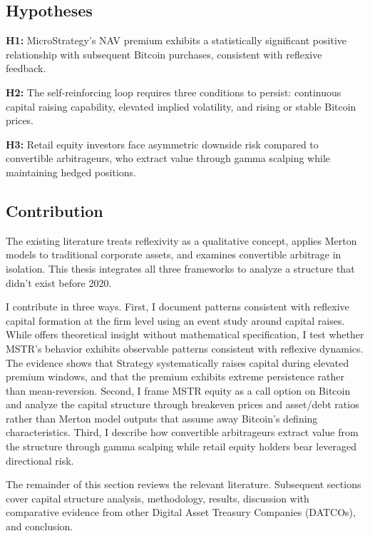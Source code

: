 \subsection{Hypotheses}

\textbf{H1:} MicroStrategy's NAV premium exhibits a statistically significant positive relationship with subsequent Bitcoin purchases, consistent with reflexive feedback.

\textbf{H2:} The self-reinforcing loop requires three conditions to persist: continuous capital raising capability, elevated implied volatility, and rising or stable Bitcoin prices.

\textbf{H3:} Retail equity investors face asymmetric downside risk compared to convertible arbitrageurs, who extract value through gamma scalping while maintaining hedged positions.

\subsection{Contribution}

The existing literature treats reflexivity as a qualitative concept, applies Merton models to traditional corporate assets, and examines convertible arbitrage in isolation. This thesis integrates all three frameworks to analyze a structure that didn't exist before 2020.

I contribute in three ways. First, I document patterns consistent with reflexive capital formation at the firm level using an event study around capital raises. While \citet{soros1987alchemy} offers theoretical insight without mathematical specification, I test whether MSTR's behavior exhibits observable patterns consistent with reflexive dynamics. The evidence shows that Strategy systematically raises capital during elevated premium windows, and that the premium exhibits extreme persistence rather than mean-reversion. Second, I frame MSTR equity as a call option on Bitcoin and analyze the capital structure through breakeven prices and asset/debt ratios rather than Merton model outputs that assume away Bitcoin's defining characteristics. Third, I describe how convertible arbitrageurs extract value from the structure through gamma scalping while retail equity holders bear leveraged directional risk.

The remainder of this section reviews the relevant literature. Subsequent sections cover capital structure analysis, methodology, results, discussion with comparative evidence from other Digital Asset Treasury Companies (DATCOs), and conclusion.


